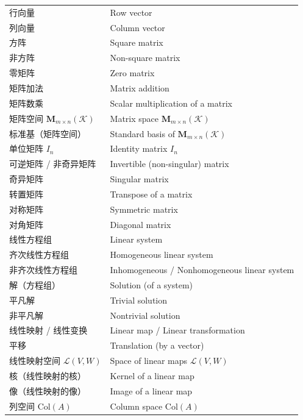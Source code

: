 \documentclass{ctexart}
\begin{document}
\begin{center}
\begin{longtable}{|>{\raggedright\arraybackslash}p{5cm}|>{\raggedright\arraybackslash}p{8cm}|}
			行向量 & Row vector \\
			列向量 & Column vector \\
			方阵 & Square matrix \\
			非方阵 & Non-square matrix \\
			零矩阵 & Zero matrix \\
			矩阵加法 & Matrix addition \\
			矩阵数乘 & Scalar multiplication of a matrix \\
			矩阵空间 $\mathbf{M}_{m\times n}(\mathcal{K})$ & Matrix space $\mathbf{M}_{m\times n}(\mathcal{K})$ \\
			标准基（矩阵空间） & Standard basis of $\mathbf{M}_{m\times n}(\mathcal{K})$ \\
			单位矩阵 $I_n$ & Identity matrix $I_n$ \\
			可逆矩阵 / 非奇异矩阵 & Invertible (non-singular) matrix \\
			奇异矩阵 & Singular matrix \\
			转置矩阵 & Transpose of a matrix \\
			对称矩阵 & Symmetric matrix \\
			对角矩阵 & Diagonal matrix \\
			线性方程组 & Linear system \\
			齐次线性方程组 & Homogeneous linear system \\
			非齐次线性方程组 & Inhomogeneous / Nonhomogeneous linear system \\
			解（方程组） & Solution (of a system) \\
			平凡解 & Trivial solution \\
			非平凡解 & Nontrivial solution \\
			线性映射 / 线性变换 & Linear map / Linear transformation \\
			平移 & Translation (by a vector) \\
			线性映射空间 $\mathcal{L}(V,W)$ & Space of linear maps $\mathcal{L}(V,W)$ \\
			核（线性映射的核） & Kernel of a linear map \\
			像（线性映射的像） & Image of a linear map \\
			列空间 $\mathrm{Col}(A)$ & Column space $\mathrm{Col}(A)$ \\

\end{longtable}
\end{center}
\end{document}
